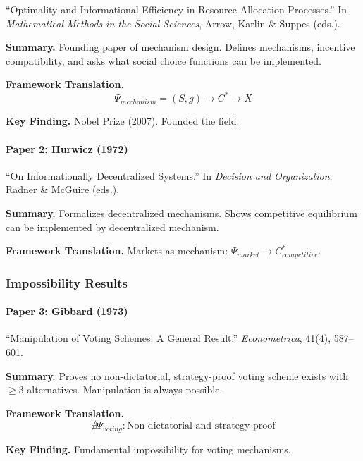 ``Optimality and Informational Efficiency in Resource Allocation Processes.''
In \textit{Mathematical Methods in the Social Sciences}, Arrow, Karlin \& Suppes (eds.).

\textbf{Summary.}
Founding paper of mechanism design. Defines mechanisms, incentive compatibility, 
and asks what social choice functions can be implemented.

\textbf{Framework Translation.}
\begin{equation}
\Psi_{mechanism} = (S, g) \to C^* \to X
\end{equation}

\textbf{Key Finding.}
Nobel Prize (2007). Founded the field.

\paragraph{Paper 2: Hurwicz (1972)}

``On Informationally Decentralized Systems.''
In \textit{Decision and Organization}, Radner \& McGuire (eds.).

\textbf{Summary.}
Formalizes decentralized mechanisms. Shows competitive equilibrium can be 
implemented by decentralized mechanism.

\textbf{Framework Translation.}
Markets as mechanism: $\Psi_{market} \to C^*_{competitive}$.

\subsubsection{Impossibility Results}

\paragraph{Paper 3: Gibbard (1973)}

``Manipulation of Voting Schemes: A General Result.''
\textit{Econometrica}, 41(4), 587--601.

\textbf{Summary.}
Proves no non-dictatorial, strategy-proof voting scheme exists with $\geq 3$ 
alternatives. Manipulation is always possible.

\textbf{Framework Translation.}
\begin{equation}
\nexists \Psi_{voting}: \text{Non-dictatorial and strategy-proof}
\end{equation}

\textbf{Key Finding.}
Fundamental impossibility for voting mechanisms.

